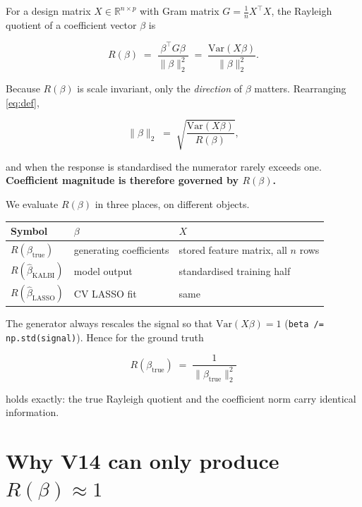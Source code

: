 \documentclass[11pt]{article}
\newcommand{\Rq}{R(\beta)}
\newcommand{\bhat}{\hat{\beta}}
\newcommand{\Rtrue}{R(\beta_{\mathrm{true}})}
\begin{document}
For a design matrix $X \in \mathbb{R}^{n \times p}$ with Gram matrix
$G = \frac{1}{n} X^\top X$, the Rayleigh quotient of a coefficient vector
$\beta$ is

\begin{equation}
\Rq \;=\; \frac{\beta^\top G \beta}{\|\beta\|_2^2}
      \;=\; \frac{\mathrm{Var}(X\beta)}{\|\beta\|_2^2}.
\label{eq:def}
\end{equation}

Because $\Rq$ is scale invariant, only the \emph{direction} of $\beta$
matters. Rearranging \eqref{eq:def},

\begin{equation}
\|\beta\|_2 \;=\; \sqrt{\frac{\mathrm{Var}(X\beta)}{\Rq}} ,
\label{eq:norm}
\end{equation}

and when the response is standardised the numerator rarely exceeds one.
\textbf{Coefficient magnitude is therefore governed by $\Rq$.}

We evaluate $\Rq$ in three places, on different objects.

\begin{table}[h]
\centering
\begin{tabular}{@{}lll@{}}
\toprule
Symbol & $\beta$ & $X$ \\
\midrule
$\Rtrue$ & generating coefficients & stored feature matrix, all $n$ rows \\
$R(\bhat_{\mathrm{KALBI}})$ & model output & standardised training half \\
$R(\bhat_{\mathrm{LASSO}})$ & CV LASSO fit & same \\
\bottomrule
\end{tabular}
\end{table}

The generator always rescales the signal so that $\mathrm{Var}(X\beta) = 1$
(\texttt{beta /= np.std(signal)}). Hence for the ground truth

\begin{equation}
\Rtrue \;=\; \frac{1}{\|\beta_{\mathrm{true}}\|_2^2}
\end{equation}

holds exactly: the true Rayleigh quotient and the coefficient norm carry
identical information.

\section{Why V14 can only produce $\Rq \approx 1$}
\end{document}
